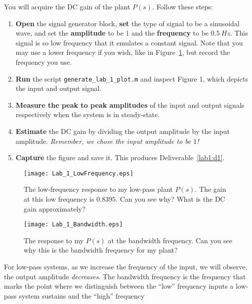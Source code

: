 \begin{procedure}[label={proc:lab1:p1}]
  You will acquire the DC gain of the plant \(P(s)\). Follow these steps:
  \begin{enumerate}[label=(\arabic*)]
    \item{
      \textbf{Open} the signal generator block, \textbf{set} the type of signal
      to be a sinusoidal wave, and set the
      \textbf{amplitude} to be \(1\) and the \textbf{frequency}
      to be \(\SI{0.5}{Hz}.\) This signal is so low frequency that it
      emulates a constant signal. Note that you may use a lower frequency if
      you wish, like in Figure~\ref{fig:lab1:lowfreq}, but record the frequency
      you use.
    }
    \item{
      \textbf{Run} the script \texttt{generate\_lab\_1\_plot.m} and inspect
      Figure 1, which depicts the input and output signal.
    }
    \item{
      \textbf{Measure the peak to peak amplitudes} of the input and output signals respectively when the system is in steady-state.
    }
    \item{
      \textbf{Estimate} the DC gain by dividing the output amplitude
      by the input amplitude. \emph{Remember, we chose the input amplitude
      to be \(1\)!}
    }
    \item{
      \textbf{Capture} the figure and save it.
      This produces Deliverable~\ref{lab1:d1}.
    }
  \end{enumerate}
\end{procedure}
%
\begin{figure}
  \texttt{[image: Lab\_1\_LowFrequency.eps]}
  \caption[Low Frequency Response of a Low-Pass Plant]{The low-frequency response to my low-pass plant \(P(s).\) The gain
  at this low frequency is \(0.8395.\) Can you see why? What is the DC
  gain approximately?}
  \label{fig:lab1:lowfreq}
\end{figure}
%
\begin{figure}
  \texttt{[image: Lab\_1\_Bandwidth.eps]}
  \caption[Time-Domain Response of a First-Order System at the Bandwidth Frequency]{The response to my \(P(s)\) at the bandwidth frequency.
  Can you see why this is the bandwidth frequency for my plant?}
  \label{fig:lab1:bandwidth}
\end{figure}
%
For low-pass systems, as we increase the frequency of the input, we will
observe, the output amplitude \emph{decreases}. The bandwidth frequency
is the frequency that marks the point where we distinguish between the
``low'' frequency inputs a low-pass system sustains and the ``high'' frequency

